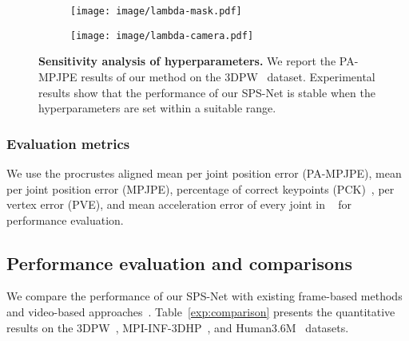 \documentclass[times,referee,twocolumn,final,authoryear]{elsarticle}
\newlength\twoimg
\begin{document}
\setlength{\twoimg}{0.495\textwidth}
\begin{figure*}[t]
  \begin{subfigure}[b]{\twoimg}
    \begin{center}
      \texttt{[image: image/lambda-mask.pdf]}
      \vspace{-2.0mm}
\end{center}
  \end{subfigure}
  \hfill
  \begin{subfigure}[b]{\twoimg}
    \begin{center}
      \texttt{[image: image/lambda-camera.pdf]}
      \vspace{-2.0mm}
\end{center}
  \end{subfigure}
  \vspace{-2.0mm}
  \caption{
  \textbf{Sensitivity analysis of hyperparameters.}
  We report the PA-MPJPE results of our method on the 3DPW~\citep{3DPW} dataset.
Experimental results show that the performance of our SPS-Net is stable when the hyperparameters are set within a suitable range.
  }
  \label{fig:hyperparameter}
  \vspace{-3.0mm}
\end{figure*}

\vspace{-3.0mm}
\subsubsection{Evaluation metrics}

We use the procrustes aligned mean per joint position error (PA-MPJPE), mean per joint position error (MPJPE), percentage of correct keypoints (PCK)~\citep{MPII}, per vertex error (PVE), and mean acceleration error of every joint in ~\citep{TemporalHMR} for performance evaluation. 

\vspace{-3.0mm}  
\subsection{Performance evaluation and comparisons}

We compare the performance of our SPS-Net with existing frame-based methods~\citep{yang20183d,chen2019unsupervised,kocabas2019self,mehta2017vnect,TCN,wandt2019repnet,CMR,sengupta2020synthetic,omran2018neural,ExPose,zanfir2020neural,HMR,SPIN} and video-based approaches~\citep{TemporalHMR,Temporal3DKinetics,doersch2019sim2real,sun2019human,VIBE}.
Table~\ref{exp:comparison} presents the quantitative results on the 3DPW~\citep{3DPW}, MPI-INF-3DHP~\citep{MPII}, and Human3.6M~\citep{human36m} datasets.
\end{document}

